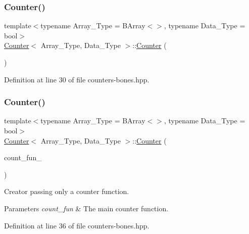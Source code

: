 \subsubsection{\texorpdfstring{Counter()}{Counter()}\hspace{0.1cm}{\footnotesize\ttfamily [1/3]}}
{\footnotesize\ttfamily template$<$typename Array\+\_\+\+Type = B\+Array$<$$>$, typename Data\+\_\+\+Type = bool$>$ \\
\hyperlink{class_counter}{Counter}$<$ Array\+\_\+\+Type, Data\+\_\+\+Type $>$\+::\hyperlink{class_counter}{Counter} (\begin{DoxyParamCaption}{ }\end{DoxyParamCaption})\hspace{0.3cm}{\ttfamily [inline]}}



Definition at line 30 of file counters-\/bones.\+hpp.

\mbox{\label{class_counter_a1cb9cb17062f8785fcb4c4babd932d68}} 
\subsubsection{\texorpdfstring{Counter()}{Counter()}\hspace{0.1cm}{\footnotesize\ttfamily [2/3]}}
{\footnotesize\ttfamily template$<$typename Array\+\_\+\+Type = B\+Array$<$$>$, typename Data\+\_\+\+Type = bool$>$ \\
\hyperlink{class_counter}{Counter}$<$ Array\+\_\+\+Type, Data\+\_\+\+Type $>$\+::\hyperlink{class_counter}{Counter} (\begin{DoxyParamCaption}\item[{\hyperlink{typedefs_8hpp_ac0160f52f564dea3ac033b374cffbfe7}{Counter\+\_\+fun\+\_\+type}$<$ Array\+\_\+\+Type, Data\+\_\+\+Type $>$}]{count\+\_\+fun\+\_\+ }\end{DoxyParamCaption})\hspace{0.3cm}{\ttfamily [inline]}}



Creator passing only a counter function. 


\begin{DoxyParams}{Parameters}
{\em count\+\_\+fun} & The main counter function. \\
\hline
\end{DoxyParams}


Definition at line 36 of file counters-\/bones.\+hpp.

